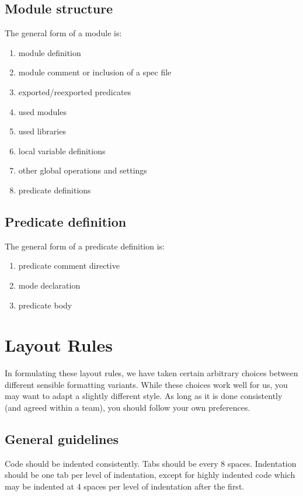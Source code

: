\documentclass[a4paper,12pt]{report}
\begin{document}
\section{Module structure}
The general form of a module is:

\begin{enumerate}
\item  module definition
\item  module comment or inclusion of a spec file
\item  exported/reexported predicates
\item  used modules
\item  used libraries
\item  local variable definitions 
\item  other global operations and settings
\item  predicate definitions
\end{enumerate}

\section{Predicate definition}
The general form of a predicate definition is:

\begin{enumerate}
\item  predicate comment directive
\item  mode declaration
\item  predicate body
\end{enumerate}

\chapter{Layout Rules}
\label{layoutrules}
In formulating these layout rules, we have taken certain arbitrary choices between different sensible formatting variants. While these choices work well for us, you may want to adapt a slightly different style. As long as it is done consistently (and agreed within a team), you should follow your own preferences.
\section{General guidelines}
Code should be indented consistently.  Tabs should be every 8 spaces.
Indentation should be one tab per level of indentation, except for
highly indented code which may be indented at 4 spaces per level of
indentation after the first.
\end{document}
